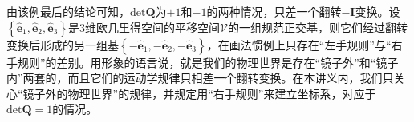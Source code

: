 \documentclass[main.tex]{subfiles}
\begin{document}
由该例最后的结论可知，$\mathrm{det}\mathbf{Q}$为$+1$和$-1$的两种情况，只差一个翻转$-\mathbf{I}$变换。设$\left\{\mathbf{\hat{e}}_1,\mathbf{\hat{e}}_2,\mathbf{\hat{e}}_3\right\}$是3维欧几里得空间的平移空间$\mathcal{V}$的一组规范正交基，则它们经过翻转变换后形成的另一组基$\left\{-\mathbf{\hat{e}}_1,-\mathbf{\hat{e}}_2,-\mathbf{\hat{e}}_3\right\}$，在画法惯例上只存在“左手规则”与“右手规则”的差别。用形象的语言说，就是我们的物理世界是存在“镜子外”和“镜子内”两套的，而且它们的运动学规律只相差一个翻转变换。在本讲义内，我们只关心“镜子外的物理世界”的规律，并规定用“右手规则”来建立坐标系，对应于$\mathrm{det}\mathbf{Q}=1$的情况。
\end{document}
